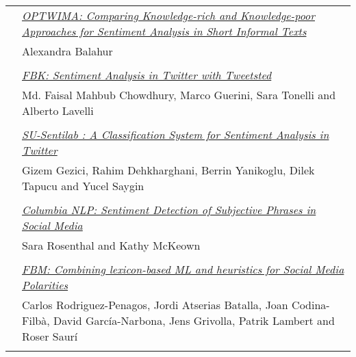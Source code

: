 \begin{tabular}{p{20mm}p{138mm}}
 & \hyperlink{page.460}{\em OPTWIMA: Comparing Knowledge-rich and Knowledge-poor Approaches for Sentiment Analysis in Short Informal Texts}\\
         & Alexandra Balahur \\
\\

 & \hyperlink{page.466}{\em FBK: Sentiment Analysis in Twitter with Tweetsted}\\
         & Md. Faisal Mahbub Chowdhury, Marco Guerini, Sara Tonelli and Alberto Lavelli \\
\\

 & \hyperlink{page.471}{\em SU-Sentilab : A Classification System for Sentiment Analysis in Twitter}\\
         & Gizem Gezici, Rahim Dehkharghani, Berrin Yanikoglu, Dilek Tapucu and Yucel Saygin \\
\\

 & \hyperlink{page.478}{\em Columbia NLP: Sentiment Detection of Subjective Phrases in Social Media}\\
         & Sara Rosenthal and Kathy McKeown \\
\\

 & \hyperlink{page.483}{\em FBM: Combining lexicon-based ML and heuristics for Social Media Polarities}\\
         & Carlos Rodriguez-Penagos, Jordi Atserias Batalla, Joan Codina-Filb\`{a}, David Garc\'{i}a-Narbona, Jens Grivolla, Patrik Lambert and Roser Saur\'{i} \\
\\



\end{tabular}
\newpage
